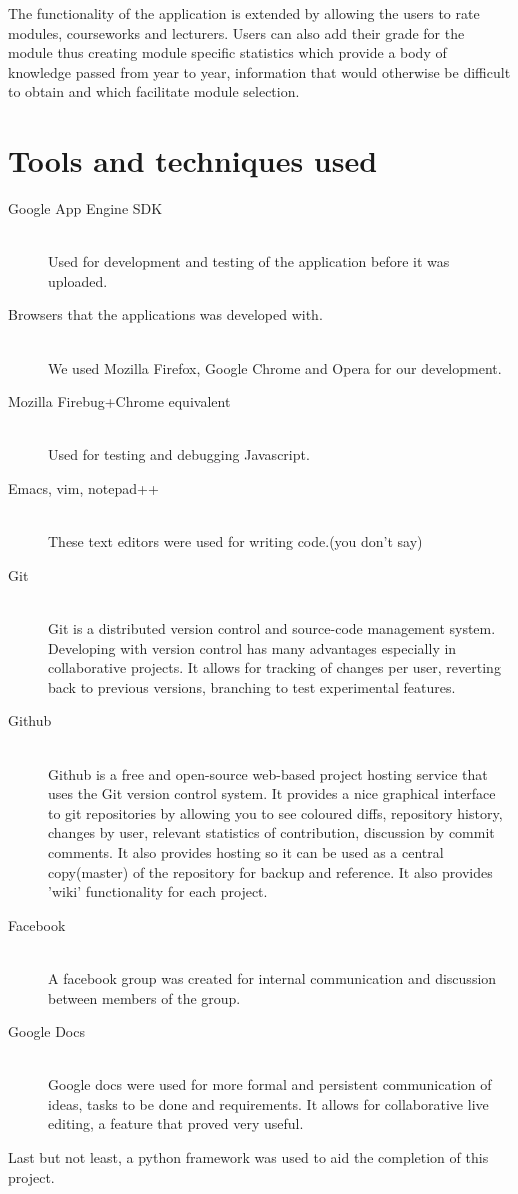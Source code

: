 \documentclass[12pt,a4paper,titlepage]{article}
\begin{document}
The functionality of the application is extended by allowing the users to rate modules, courseworks and lecturers. Users can also add their grade for the module thus creating module specific statistics which provide a body of knowledge passed from year to year, information that would otherwise be difficult to obtain and which facilitate module selection. 
\newpage
\section{Tools and techniques used}
 \begin{description}
 \item[Google App Engine SDK]\hfill\\
  Used for development and testing of the application before it was uploaded.
  \item[Browsers that the applications was developed with.]\hfill\\
  	We used Mozilla Firefox, Google Chrome and Opera for our development.
\item[Mozilla Firebug+Chrome equivalent]\hfill\\
  Used for testing and debugging Javascript.
  \item[Emacs, vim, notepad++] \hfill \\
  These text editors were used for writing code.(you don't say)
  \item[Git] \hfill \\
  Git is a distributed version control and source-code management system. Developing with version control has many advantages especially in collaborative projects. It allows for tracking of changes per user, reverting back to previous versions, branching to test experimental features. 
  \item[Github] \hfill \\
  Github is a free and open-source web-based project hosting service that uses the Git version control system.  It provides a nice graphical interface to git repositories by allowing you to see coloured diffs, repository history, changes by user, relevant statistics of contribution, discussion by commit comments. It also provides hosting so it can be used as a central copy(master) of the repository for backup and reference. It also provides 'wiki' functionality for each project.
\item[Facebook] \hfill \\
  A facebook group was created for internal communication and discussion between members of the group. 
\item[Google Docs] \hfill \\
  Google docs were used for more formal and persistent communication of ideas, tasks to be done and requirements. It allows for collaborative live editing, a feature that proved very useful.
\end{description}
Last but not least, a python framework was used to aid the completion of this project. 
\end{document}

